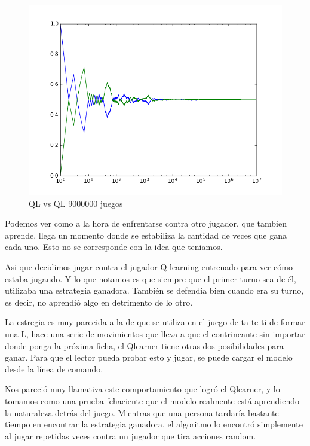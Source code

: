 \begin{figure}[h]
 \centering
 \begin{minipage}{.45\textwidth}
	\centering
	\includegraphics[scale=0.35]{img/QlearningQlearningEgreedy9000000.png}
        \caption{QL vs QL 9000000 juegos}
  \end{minipage}
\end{figure}

Podemos ver como a la hora de enfrentarse contra otro jugador, que tambien aprende, llega un momento donde se estabiliza la
 cantidad de veces que gana cada uno. Esto no se corresponde con la idea que teniamos. 

Asi que decidimos jugar contra el jugador Q-learning entrenado para ver c\'omo estaba jugando. Y lo que notamos es que siempre que el primer turno sea de \'el, utilizaba una estrategia ganadora. Tambi\'en se defend\'ia bien cuando era su turno, es decir, no aprendi\'o algo en detrimento de lo otro.

La estregia es muy parecida a la de que se utiliza en el juego de ta-te-ti de formar una L, hace una serie de movimientos que lleva a que el contrincante sin importar donde ponga la pr\'oxima ficha, el Qlearner tiene otras dos posibilidades para ganar. Para que el lector pueda probar esto y jugar, se puede cargar el modelo desde la l\'inea de comando.

Nos pareci\'o muy llamativa este comportamiento que logr\'o el Qlearner, y lo tomamos como una prueba fehaciente que el modelo realmente est\'a aprendiendo la naturaleza detr\'as del juego. Mientras que una persona tardar\'ia bastante tiempo en encontrar la estrategia ganadora, el algoritmo lo encontr\'o simplemente al jugar repetidas veces contra un jugador que tira acciones random.


